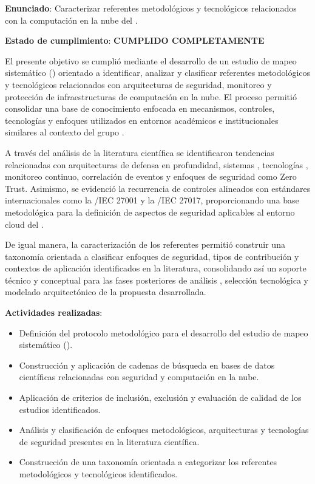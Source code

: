 \textbf{Enunciado}: Caracterizar referentes metodológicos y tecnológicos relacionados con la computación en la nube del \GRID.

\textbf{Estado de cumplimiento}: \textbf{CUMPLIDO COMPLETAMENTE}

El presente objetivo se cumplió mediante el desarrollo de un estudio de mapeo sistemático (\SMS) orientado a identificar, analizar y 
clasificar referentes metodológicos y tecnológicos relacionados con arquitecturas de seguridad, monitoreo y protección de infraestructuras 
de computación en la nube. El proceso permitió consolidar una base de conocimiento enfocada en mecanismos, controles, tecnologías y 
enfoques utilizados en entornos académicos e institucionales similares al contexto del grupo \GRID.

A través del análisis de la literatura científica se identificaron tendencias relacionadas con arquitecturas de defensa en profundidad, 
sistemas \SIEM, tecnologías \IDPS, monitoreo continuo, correlación de eventos y enfoques de seguridad como Zero Trust. Asimismo, se 
evidenció la recurrencia de controles alineados con estándares internacionales como la \ISO/IEC 27001 y la \ISO/IEC 27017, proporcionando 
una base metodológica para la definición de aspectos de seguridad aplicables al entorno cloud del \GRID.

De igual manera, la caracterización de los referentes permitió construir una taxonomía orientada a clasificar enfoques de seguridad, tipos 
de contribución y contextos de aplicación identificados en la literatura, consolidando así un soporte técnico y conceptual para las fases 
posteriores de análisis \DAR, selección tecnológica y modelado arquitectónico de la propuesta desarrollada.

\textbf{Actividades realizadas}:
\begin{itemize}
    \item Definición del protocolo metodológico para el desarrollo del estudio de mapeo sistemático (\SMS).
	\item Construcción y aplicación de cadenas de búsqueda en bases de datos científicas relacionadas con seguridad y computación en la nube.
	\item Aplicación de criterios de inclusión, exclusión y evaluación de calidad de los estudios identificados.
	\item Análisis y clasificación de enfoques metodológicos, arquitecturas y tecnologías de seguridad presentes en la literatura científica.
	\item Construcción de una taxonomía orientada a categorizar los referentes metodológicos y tecnológicos identificados.
\end{itemize}


